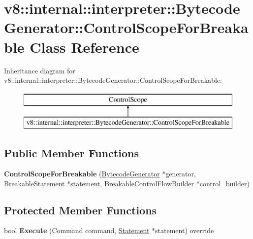 \hypertarget{classv8_1_1internal_1_1interpreter_1_1_bytecode_generator_1_1_control_scope_for_breakable}{}\section{v8\+:\+:internal\+:\+:interpreter\+:\+:Bytecode\+Generator\+:\+:Control\+Scope\+For\+Breakable Class Reference}
\label{classv8_1_1internal_1_1interpreter_1_1_bytecode_generator_1_1_control_scope_for_breakable}
Inheritance diagram for v8\+:\+:internal\+:\+:interpreter\+:\+:Bytecode\+Generator\+:\+:Control\+Scope\+For\+Breakable\+:\begin{figure}[H]
\begin{center}
\leavevmode
\includegraphics[height=2.000000cm]{classv8_1_1internal_1_1interpreter_1_1_bytecode_generator_1_1_control_scope_for_breakable}
\end{center}
\end{figure}
\subsection*{Public Member Functions}
\begin{DoxyCompactItemize}
\item 
{\bfseries Control\+Scope\+For\+Breakable} (\hyperlink{classv8_1_1internal_1_1interpreter_1_1_bytecode_generator}{Bytecode\+Generator} $\ast$generator, \hyperlink{classv8_1_1internal_1_1_breakable_statement}{Breakable\+Statement} $\ast$statement, \hyperlink{classv8_1_1internal_1_1interpreter_1_1_breakable_control_flow_builder}{Breakable\+Control\+Flow\+Builder} $\ast$control\+\_\+builder)\hypertarget{classv8_1_1internal_1_1interpreter_1_1_bytecode_generator_1_1_control_scope_for_breakable_a4f3c709adbdda63342b624f94eae12d9}{}\label{classv8_1_1internal_1_1interpreter_1_1_bytecode_generator_1_1_control_scope_for_breakable_a4f3c709adbdda63342b624f94eae12d9}

\end{DoxyCompactItemize}
\subsection*{Protected Member Functions}
\begin{DoxyCompactItemize}
\item 
bool {\bfseries Execute} (Command command, \hyperlink{classv8_1_1internal_1_1_statement}{Statement} $\ast$statement) override\hypertarget{classv8_1_1internal_1_1interpreter_1_1_bytecode_generator_1_1_control_scope_for_breakable_a9344412062621f862479a245f7d5b869}{}\label{classv8_1_1internal_1_1interpreter_1_1_bytecode_generator_1_1_control_scope_for_breakable_a9344412062621f862479a245f7d5b869}

\end{DoxyCompactItemize}
